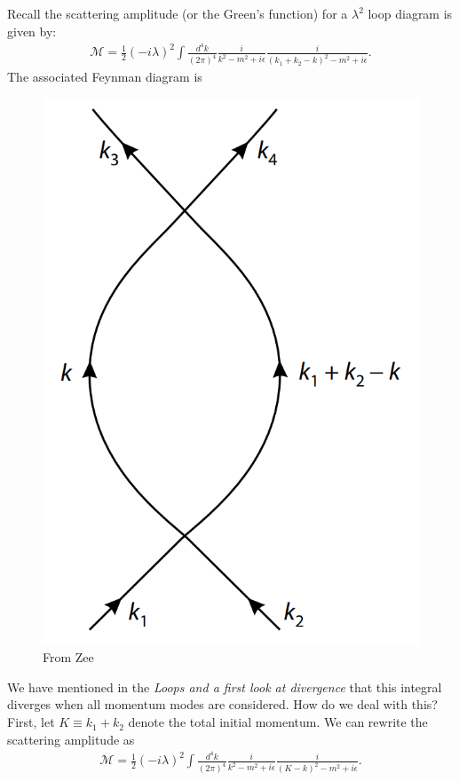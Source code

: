 \documentclass{book}
\theoremstyle{definition}
\newcommand{\f}[2]{\frac{#1}{#2}}
\begin{document}
Recall the scattering amplitude (or the Green's function) for a $\lambda^2$ loop diagram is given by:
\begin{align}
\mathcal{M} = \f{1}{2}(-i\lambda)^2\int \f{d^4k}{(2\pi)^4}\f{i}{k^2 - m^2 + i\epsilon}\f{i}{(k_1 + k_2 - k)^2 - m^2 + i\epsilon}.
\end{align}
The associated Feynman diagram is
\begin{figure}[!htb]
	\centering
	\includegraphics[scale=0.3]{loop-feynman}
	\caption{From Zee}
\end{figure}

We have mentioned in the \textit{Loops and a first look at divergence} that this integral diverges when all momentum modes are considered. How do we deal with this? First, let $K \equiv k_1 + k_2$ denote the total initial momentum. We can rewrite the scattering amplitude as
\begin{align}
\mathcal{M} = \f{1}{2}(-i\lambda)^2\int \f{d^4k}{(2\pi)^4}\f{i}{k^2 - m^2 + i\epsilon}\f{i}{(K - k)^2 - m^2 + i\epsilon}.
\end{align} 
\end{document}
